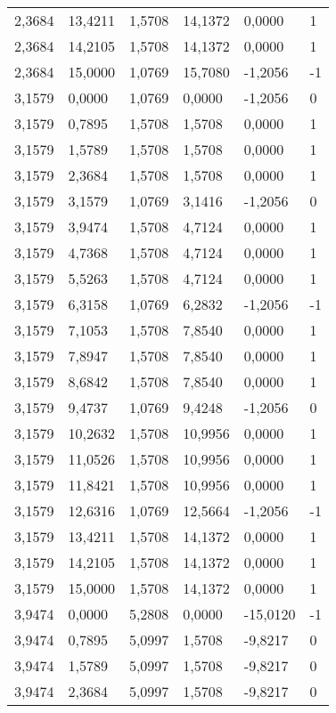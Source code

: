 \begin{longtable}{@{}llllll@{}}
		2,3684  & 13,4211 & 1,5708  & 14,1372 & 0,0000   & 1  \\
		2,3684  & 14,2105 & 1,5708  & 14,1372 & 0,0000   & 1  \\
		2,3684  & 15,0000 & 1,0769  & 15,7080 & -1,2056  & -1 \\
		3,1579  & 0,0000  & 1,0769  & 0,0000  & -1,2056  & 0  \\
		3,1579  & 0,7895  & 1,5708  & 1,5708  & 0,0000   & 1  \\
		3,1579  & 1,5789  & 1,5708  & 1,5708  & 0,0000   & 1  \\
		3,1579  & 2,3684  & 1,5708  & 1,5708  & 0,0000   & 1  \\
		3,1579  & 3,1579  & 1,0769  & 3,1416  & -1,2056  & 0  \\
		3,1579  & 3,9474  & 1,5708  & 4,7124  & 0,0000   & 1  \\
		3,1579  & 4,7368  & 1,5708  & 4,7124  & 0,0000   & 1  \\
		3,1579  & 5,5263  & 1,5708  & 4,7124  & 0,0000   & 1  \\
		3,1579  & 6,3158  & 1,0769  & 6,2832  & -1,2056  & -1 \\
		3,1579  & 7,1053  & 1,5708  & 7,8540  & 0,0000   & 1  \\
		3,1579  & 7,8947  & 1,5708  & 7,8540  & 0,0000   & 1  \\
		3,1579  & 8,6842  & 1,5708  & 7,8540  & 0,0000   & 1  \\
		3,1579  & 9,4737  & 1,0769  & 9,4248  & -1,2056  & 0  \\
		3,1579  & 10,2632 & 1,5708  & 10,9956 & 0,0000   & 1  \\
		3,1579  & 11,0526 & 1,5708  & 10,9956 & 0,0000   & 1  \\
		3,1579  & 11,8421 & 1,5708  & 10,9956 & 0,0000   & 1  \\
		3,1579  & 12,6316 & 1,0769  & 12,5664 & -1,2056  & -1 \\
		3,1579  & 13,4211 & 1,5708  & 14,1372 & 0,0000   & 1  \\
		3,1579  & 14,2105 & 1,5708  & 14,1372 & 0,0000   & 1  \\
		3,1579  & 15,0000 & 1,5708  & 14,1372 & 0,0000   & 1  \\
		3,9474  & 0,0000  & 5,2808  & 0,0000  & -15,0120 & -1 \\
		3,9474  & 0,7895  & 5,0997  & 1,5708  & -9,8217  & 0  \\
		3,9474  & 1,5789  & 5,0997  & 1,5708  & -9,8217  & 0  \\
		3,9474  & 2,3684  & 5,0997  & 1,5708  & -9,8217  & 0  \\

\end{longtable}
